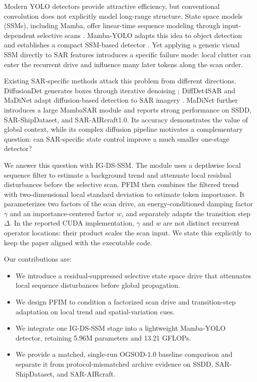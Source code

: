 \documentclass[letterpaper]{article}
\newcommand{\method}{IG-DS-SSM}
\begin{document}
Modern YOLO detectors provide attractive efficiency, but conventional convolution does not explicitly model long-range structure. State space models (SSMs), including Mamba, offer linear-time sequence modeling through input-dependent selective scans \citep{mamba,s4}. Mamba-YOLO adapts this idea to object detection and establishes a compact SSM-based detector \citep{mambayolo}. Yet applying a generic visual SSM directly to SAR features introduces a specific failure mode: local clutter can enter the recurrent drive and influence many later tokens along the scan order.

Existing SAR-specific methods attack this problem from different directions. DiffusionDet generates boxes through iterative denoising \citep{diffusiondet}; DiffDet4SAR and MaDiNet adapt diffusion-based detection to SAR imagery \citep{diffdet4sar,madinet}. MaDiNet further introduces a large MambaSAR module and reports strong performance on SSDD, SAR-ShipDataset, and SAR-AIRcraft1.0. Its accuracy demonstrates the value of global context, while its complex diffusion pipeline motivates a complementary question: can SAR-specific state control improve a much smaller one-stage detector?

We answer this question with \method. The module uses a depthwise local sequence filter to estimate a background trend and attenuate local residual disturbances before the selective scan. PFIM then combines the filtered trend with two-dimensional local standard deviation to estimate token importance. It parameterizes two factors of the scan drive, an energy-conditioned damping factor $\gamma$ and an importance-centered factor $w$, and separately adapts the transition step $\Delta$. In the reported CUDA implementation, $\gamma$ and $w$ are not distinct recurrent operator locations: their product scales the scan input. We state this explicitly to keep the paper aligned with the executable code.

Our contributions are:
\begin{itemize}
  \item We introduce a residual-suppressed selective state space drive that attenuates local sequence disturbances before global propagation.
  \item We design PFIM to condition a factorized scan drive and transition-step adaptation on local trend and spatial-variation cues.
  \item We integrate one \method{} stage into a lightweight Mamba-YOLO detector, retaining 5.96M parameters and 13.21 GFLOPs.
\item We provide a matched, single-run OGSOD-1.0 baseline comparison and separate it from protocol-mismatched archive evidence on SSDD, SAR-ShipDataset, and SAR-AIRcraft.
\end{itemize}
\end{document}
